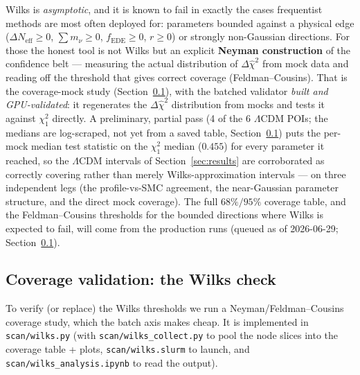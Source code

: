 \documentclass[11pt]{article}
\newcommand{\file}[1]{\texttt{\small #1}}
\newcommand{\Neff}{N_{\mathrm{eff}}}
\newcommand{\chisq}{\chi^2}
\newcommand{\dchisq}{\Delta\hat\chi^2}
\begin{document}
Wilks is \emph{asymptotic}, and it is known to fail in exactly the cases
frequentist methods are most often deployed for: parameters bounded against
a physical edge ($\Delta\Neff\ge0$, $\sum m_\nu\ge0$, $f_{\mathrm{EDE}}\ge0$,
$r\ge0$) or strongly non-Gaussian directions. For those the honest tool is not Wilks
but an explicit \textbf{Neyman construction} of the confidence belt ---
measuring the actual distribution of $\dchisq$ from mock data and reading
off the threshold that gives correct coverage (Feldman--Cousins). That is
the coverage-mock study (Section~\ref{sec:coverage}), with the batched
validator \emph{built and GPU-validated}: it regenerates the $\dchisq$
distribution from mocks and tests it against $\chisq_1$ directly. A
preliminary, partial pass (4 of the 6 $\Lambda$CDM POIs; the medians are
log-scraped, not yet from a saved table, Section~\ref{sec:coverage}) puts
the per-mock median test statistic on the $\chisq_1$ median ($0.455$) for
every parameter it reached, so the $\Lambda$CDM intervals of
Section~\ref{sec:results} are corroborated as correctly covering rather than
merely Wilks-approximation intervals --- on three independent legs (the
profile-vs-SMC agreement, the near-Gaussian parameter structure, and the
direct mock coverage). The full $68\%/95\%$ coverage table, and the
Feldman--Cousins thresholds for the bounded directions where Wilks is
expected to fail, will come from the production runs (queued as of
2026-06-29; Section~\ref{sec:coverage}).

\subsection{Coverage validation: the Wilks check}
\label{sec:coverage}

To verify (or replace) the Wilks thresholds we run a
Neyman/Feldman--Cousins coverage study, which the batch axis makes cheap.
It is implemented in \file{scan/wilks.py} (with \file{scan/wilks\_collect.py}
to pool the node slices into the coverage table + plots, \file{scan/wilks.slurm}
to launch, and \file{scan/wilks\_analysis.ipynb} to read the output).
\end{document}
